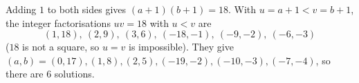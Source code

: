 Adding $1$ to both sides gives $(a+1)(b+1)=18$. With $u=a+1<v=b+1$, the integer factorisations $uv=18$ with $u<v$ are
\[
(1,18),\ (2,9),\ (3,6),\ (-18,-1),\ (-9,-2),\ (-6,-3)
\]
($18$ is not a square, so $u=v$ is impossible). They give $(a,b)=(0,17),(1,8),(2,5),(-19,-2),(-10,-3),(-7,-4)$, so there are $\boxed{6}$ solutions.
